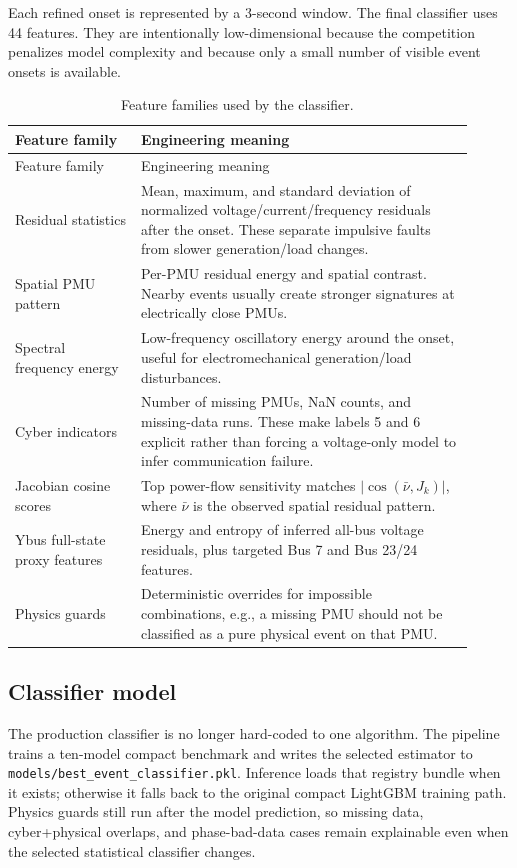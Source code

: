 \documentclass[11pt]{article}
\begin{document}
Each refined onset is represented by a 3-second window. The final classifier uses
44 features. They are intentionally low-dimensional because the competition
penalizes model complexity and because only a small number of visible event
onsets is available.

\begin{longtable}{p{0.25\linewidth}p{0.66\linewidth}}
\caption{Feature families used by the classifier.}\\
\toprule
Feature family & Engineering meaning \\
\midrule
\endfirsthead
\toprule
Feature family & Engineering meaning \\
\midrule
\endhead
Residual statistics & Mean, maximum, and standard deviation of normalized
voltage/current/frequency residuals after the onset. These separate impulsive
faults from slower generation/load changes.\\
Spatial PMU pattern & Per-PMU residual energy and spatial contrast. Nearby
events usually create stronger signatures at electrically close PMUs.\\
Spectral frequency energy & Low-frequency oscillatory energy around the onset,
useful for electromechanical generation/load disturbances.\\
Cyber indicators & Number of missing PMUs, NaN counts, and missing-data runs.
These make labels 5 and 6 explicit rather than forcing a voltage-only model to
infer communication failure.\\
Jacobian cosine scores & Top power-flow sensitivity matches
$|\cos(\bar{\nu},J_k)|$, where $\bar{\nu}$ is the observed spatial residual
pattern.\\
Ybus full-state proxy features & Energy and entropy of inferred all-bus voltage
residuals, plus targeted Bus 7 and Bus 23/24 features.\\
Physics guards & Deterministic overrides for impossible combinations, e.g., a
missing PMU should not be classified as a pure physical event on that PMU.\\
\bottomrule
\end{longtable}

\subsection{Classifier model}

The production classifier is no longer hard-coded to one algorithm. The
pipeline trains a ten-model compact benchmark and writes the selected estimator
to \texttt{models/best\_event\_classifier.pkl}. Inference loads that registry
bundle when it exists; otherwise it falls back to the original compact LightGBM
training path. Physics guards still run after the model prediction, so missing
data, cyber+physical overlaps, and phase-bad-data cases remain explainable even
when the selected statistical classifier changes.
\end{document}
